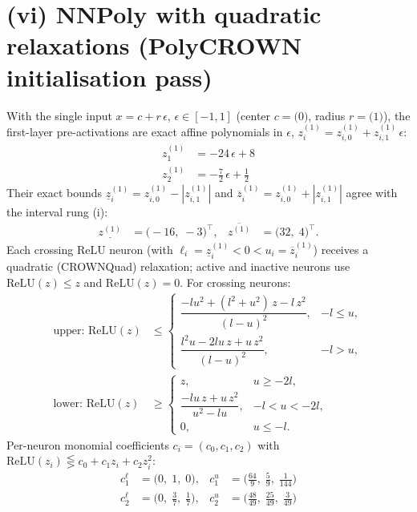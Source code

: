 \documentclass[11pt]{article}
\begin{document}
\section{(vi) NNPoly with quadratic relaxations (PolyCROWN initialisation pass)}
With the single input $x = c + r\,\epsilon$, $\epsilon \in [-1, 1]$ (center $c = \bigl(0\bigr)$, radius $r = \bigl(1\bigr)$), the first-layer pre-activations are exact affine polynomials in $\epsilon$, $z^{(1)}_i = z^{(1)}_{i,0} + z^{(1)}_{i,1}\,\epsilon$:
\begin{align*}
z^{(1)}_{1} &= -24\,\epsilon + 8 \\
z^{(1)}_{2} &= -\frac{7}{2}\,\epsilon + \frac{1}{2}
\end{align*}
Their exact bounds $\underline{z}^{(1)}_i = z^{(1)}_{i,0} - |z^{(1)}_{i,1}|$ and $\overline{z}^{(1)}_i = z^{(1)}_{i,0} + |z^{(1)}_{i,1}|$ agree with the interval rung (i):
\begin{align*}
\underline{z^{(1)}} &= \bigl(-16,\; -3\bigr)^{\!\top}, & \overline{z^{(1)}} &= \bigl(32,\; 4\bigr)^{\!\top}.
\end{align*}
Each crossing ReLU neuron (with $\ell_i = \underline{z}^{(1)}_i < 0 < u_i = \overline{z}^{(1)}_i$)
receives a quadratic (CROWNQuad) relaxation; active and inactive neurons use $\mathrm{ReLU}(z) \le z$
and $\mathrm{ReLU}(z) = 0$. For crossing neurons:
\begin{align*}
\text{upper: } \mathrm{ReLU}(z) &\le \begin{cases} \dfrac{-l u^2 + (l^2 + u^2)\, z - l\, z^2}{(l - u)^2}, & -l \le u, \\[3mm] \dfrac{l^2 u - 2 l u\, z + u\, z^2}{(l - u)^2}, & -l > u, \end{cases} \\[2mm]
\text{lower: } \mathrm{ReLU}(z) &\ge \begin{cases} z, & u \ge -2l, \\[3mm] \dfrac{-l u\, z + u\, z^2}{u^2 - l u}, & -l < u < -2l, \\[3mm] 0, & u \le -l. \end{cases}
\end{align*}
Per-neuron monomial coefficients $c_i = (c_0, c_1, c_2)$ with $\mathrm{ReLU}(z_i) \lesseqgtr c_0 + c_1 z_i + c_2 z_i^2$:
\begin{align*}
c^{\ell}_{1} &= \bigl(0,\; 1,\; 0\bigr), & c^{u}_{1} &= \bigl(\frac{64}{9},\; \frac{5}{9},\; \frac{1}{144}\bigr) \\
c^{\ell}_{2} &= \bigl(0,\; \frac{3}{7},\; \frac{1}{7}\bigr), & c^{u}_{2} &= \bigl(\frac{48}{49},\; \frac{25}{49},\; \frac{3}{49}\bigr)
\end{align*}
\end{document}

